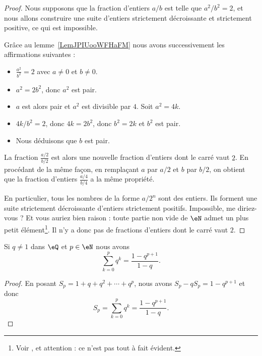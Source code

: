 \begin{proof}
	Nous supposons que la fraction d'entiers \( a/b\) est telle que \( a^2/b^2=2\), et nous allons construire une suite d'entiers strictement décroissante et strictement positive, ce qui est impossible.

	Grâce au lemme~\ref{LemJPIUooWFHaFM} nous avons successivement les affirmations suivantes :
	\begin{itemize}
		\item
		      \(\frac{ a^2 }{ b^2 }=2 \)  avec \( a\neq 0\) et \( b\neq 0\).
		\item
		      \( a^2=2b^2\), donc \( a^2\) est pair.
		\item
		      \( a\) est alors pair et \( a^2\) est divisible par \( 4\). Soit \( a^2=4k\).
		\item
		      \( 4k/b^2=2\), donc \( 4k=2b^2\), donc \( b^2=2k\) et \( b^2\) est pair.
		\item
		      Nous déduisons que \( b\) est pair.
	\end{itemize}
	La fraction \( \frac{ a/2 }{ b/2 }\) est alors une nouvelle fraction d'entiers dont le carré vaut \( 2\). En procédant de la même façon, en remplaçant \( a\) par \( a/2\) et \( b\) par \( b/2\), on obtient que la fraction d'entiers \( \frac{ a/4 }{ b/4 }\) a la même propriété.

	En particulier, tous les nombres de la forme \( a/2^n\) sont des entiers.  Ils forment une suite strictement décroissante d'entiers strictement positifs. Impossible, me diriez-vous ? Et vous auriez bien raison : toute partie non vide de \( \eN\) admet un plus petit élément\footnote{Voir \cite{RWWJooJdjxEK}, et attention : ce n'est pas tout à fait évident.}. Il n'y a donc pas de fractions d'entiers dont le carré vaut \( 2\).
\end{proof}

\begin{lemma}   \label{LEMooOTVUooImvusn}
	Si \( q\neq 1\) dans \( \eQ\) et \( p\in \eN\) nous avons
	\begin{equation}
		\sum_{k=0}^pq^k=\frac{ 1-q^{p+1} }{ 1-q }.
	\end{equation}
\end{lemma}

\begin{proof}
	En posant \( S_p=1+q+q^2+\cdots +q^{p}\), nous avons \( S_p-qS_p=1-q^{p+1}\) et donc
	\begin{equation}
		S_p=\sum_{k=0}^pq^k=\frac{ 1-q^{p+1} }{ 1-q }.
	\end{equation}
\end{proof}

